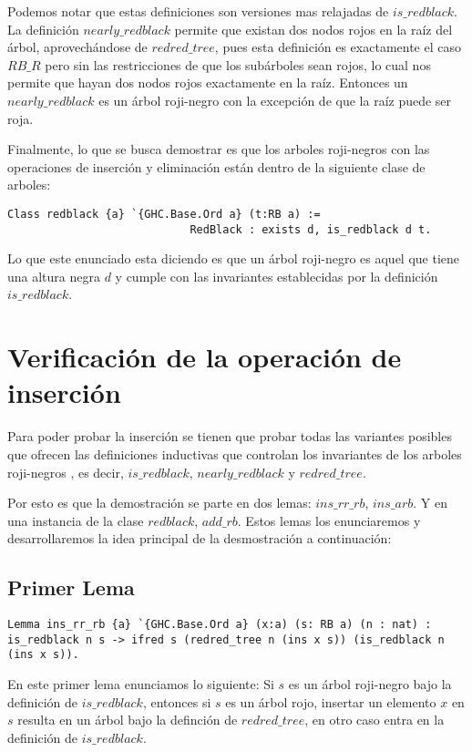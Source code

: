 \documentclass[letterpaper,12pt,oneside]{book}
\newcommand{\arn}{árbol roji-negro }
\newcommand{\arns}{arboles roji-negros }
\theoremstyle{plain}
\theoremstyle{definition}
\theoremstyle{remark}
\begin{document}
Podemos notar que estas definiciones son versiones mas relajadas de $is\_redblack$. La definici\'on $nearly\_redblack$ permite que existan dos nodos rojos
en la ra\'iz del \'arbol, aprovech\'andose de $redred\_tree$, pues esta definici\'on es exactamente el caso $RB\_R$ pero sin las restricciones de que los sub\'arboles sean rojos, lo 
cual nos permite que hayan dos nodos rojos exactamente en la ra\'iz. Entonces un $nearly\_redblack$ es un \arn con la excepci\'on de que la ra\'iz puede ser roja. 

Finalmente, lo que se busca demostrar es que los \arns con las operaciones de inserci\'on y eliminaci\'on están dentro de la siguiente clase de arboles:

\begin{verbatim}
Class redblack {a} `{GHC.Base.Ord a} (t:RB a) := 
                            RedBlack : exists d, is_redblack d t.
\end{verbatim}

Lo que este enunciado esta diciendo es que un \arn es aquel que tiene una altura negra $d$ y cumple con las invariantes establecidas por la definici\'on 
$is\_redblack$.
\section{Verificación de la operación de inserción}

Para poder probar la inserci\'on se tienen que probar todas las variantes posibles que ofrecen las definiciones inductivas
que controlan los invariantes de los \arns, es decir, $is\_redblack$, $nearly\_redblack$ y $redred\_tree$.

Por esto es que la demostraci\'on se parte en dos lemas: $ins\_rr\_rb$, $ins\_arb$. Y en una instancia\cite{classes} de la clase $redblack$, $add\_rb$. Estos lemas los enunciaremos
y desarrollaremos la idea principal de la desmostraci\'on a continuaci\'on:

\subsection{Primer Lema}

\begin{verbatim}
Lemma ins_rr_rb {a} `{GHC.Base.Ord a} (x:a) (s: RB a) (n : nat) :
is_redblack n s -> ifred s (redred_tree n (ins x s)) (is_redblack n (ins x s)).
\end{verbatim}
 En este primer lema enunciamos lo siguiente: Si $s$ es un \arn bajo la definici\'on de $is\_redblack$, entonces 
 si $s$ es un \'arbol rojo, insertar un elemento $x$ en $s$ resulta en un \'arbol bajo la definci\'on de 
 $redred\_tree$, en otro caso entra en la definici\'on de $is\_redblack$.
\end{document}

